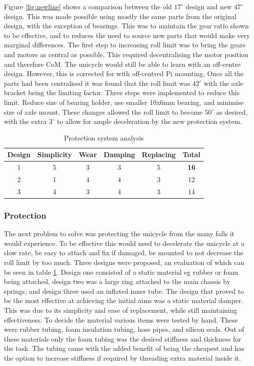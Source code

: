 \documentclass[twoside,twocolumn,12pt]{article}
\begin{document}
Figure \ref{fig:newline} shows a comparison between the old $17^{\circ}$ design and new $47^{\circ}$ design. This was made possible using mostly the same parts from the original design, with the exception of bearings. This was to maintain the gear ratio shown to be effective, and to reduces the need to source new parts that would make very marginal differences. 
\newline
The first step to increasing roll limit was to bring the gears and motors as central as possible. This required decentralising the motor position and therefore CoM. The unicycle would still be able to learn with an off-centre design. However, this is corrected for with off-centred Pi mounting. Once all the parts had been centralised it was found that the roll limit was $42^{\circ}$ with the axle bracket being the limiting factor. 
\newline
Three steps were implemented to reduce this limit. Reduce size of bearing holder, use smaller 10x6mm bearing, and minimise size of axle mount. These changes allowed the roll limit to become $50^{\circ}$ as desired, with the extra $3^{\circ}$ to allow for ample deceleration by the new protection system.  
\begin{table}[ht!]
\centering
\begin{tabular}{ c | c | c | c | c | c}
Design& Simplicity & Wear & Damping &Replacing & Total\\ 
\midrule
1&5 &3 &3&5&\textbf{16}\\
2&1& 4&4&3&12\\
3&4&3 &4&3&14\\
\end{tabular}
\caption{Protection system analysis}
\label{tab:pro}
\end{table}

\subsubsection{Protection}
The next problem to solve was protecting the unicycle from the many falls it would experience. To be effective this would need to decelerate the unicycle at a slow rate, be easy to attach and fix if damaged, be mounted to not decrease the roll limit by too much.
\newline
Three designs were proposed, an evaluation of which can be seen in table \ref{tab:pro}. Design one consisted of a static material eg rubber or foam being attached, design two was a large ring attached to the main chassis by springs, and design three used an inflated inner tube. The design that proved to be the most effective at achieving the initial aims was a static material damper. This was due to its simplicity and ease of replacement, while still maintaining effectiveness. To decide the material various items were tested by hand. These were rubber tubing, foam insulation tubing, hose pipes, and silicon seals. Out of these materials only the foam tubing was the desired stiffness and thickness for the task. The tubing came with the added benefit of being the cheapest and has the option to increase stiffness if required by threading extra material inside it.
\end{document}
